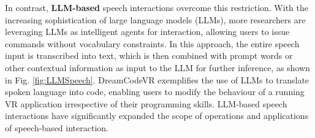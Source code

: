 \documentclass[review]{fcs}
\newcommand{\revise}[2]{\textcolor[rgb]{0,0,0}{#2}}
\begin{document}
In contrast, \textbf{LLM-based} speech interactions overcome this restriction. With the increasing sophistication of large language models (LLMs), more researchers are leveraging LLMs as intelligent agents for interaction, allowing users to issue commands without vocabulary constraints. 
\revise{In this approach, the entire speech input is transcribed into text, which is then combined with prompt words or other contextual information as input to the LLM for further inference\cite{DBLP:conf/chi/WangYWJ024, DBLP:conf/vr/GiunchiNGS24, DBLP:conf/chi/0005WBCRF24, DBLP:conf/chi/TorreFHBFL24}.}{In this approach, the entire speech input is transcribed into text, which is then combined with prompt words or other contextual information as input to the LLM for further inference\cite{DBLP:conf/chi/WangYWJ024, DBLP:conf/vr/GiunchiNGS24, DBLP:conf/chi/0005WBCRF24, DBLP:conf/chi/TorreFHBFL24}, as shown in Fig. \ref{fig:LLMSpeech}.} 
\revise{DreamCodeVR exemplifies the use of LLMs to translate spoken language into code, enabling users to modify the behaviour of a running VR application irrespective of their programming skills \cite{DBLP:conf/vr/GiunchiNGS24}.}{DreamCodeVR \cite{DBLP:conf/vr/GiunchiNGS24} exemplifies the use of LLMs to translate spoken language into code, enabling users to modify the behaviour of a running VR application irrespective of their programming skills.} LLM-based speech interactions have significantly expanded the scope of operations and applications of speech-based interaction.
\end{document}
